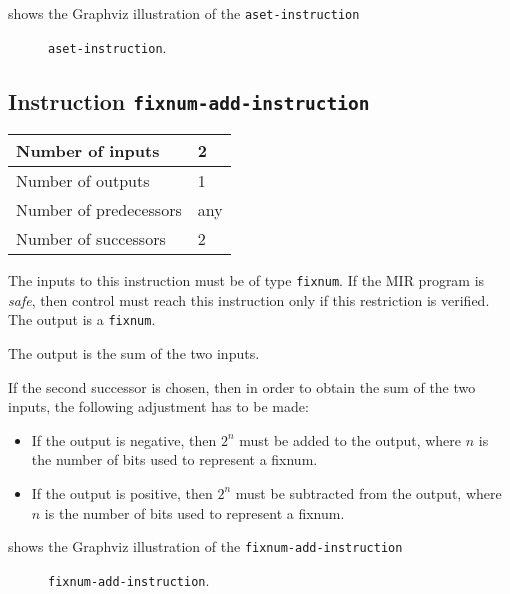  shows the Graphviz illustration of the
\texttt{aset-instruction}

\begin{figure}
\begin{center}
\end{center}
\caption{\label{fig-aset-instruction}
\texttt{aset-instruction}.}
\end{figure}

\subsection{Instruction \texttt{fixnum-add-instruction}}
\label{mir-instruction-fixnum-add}

\begin{tabular}{|l|l|}
\hline
Number of inputs & 2\\
\hline
Number of outputs & 1\\
\hline
Number of predecessors & any\\
\hline
Number of successors & 2\\
\hline
\end{tabular}

The inputs to this instruction must be of type \texttt{fixnum}.  If the
MIR program is \emph{safe}, then control must reach this instruction
only if this restriction is verified.  The output is a
\texttt{fixnum}.  

The output is the sum of the two inputs.

If the second successor is chosen, then in order to obtain the sum of the
two inputs, the following adjustment has to be made:

\begin{itemize}
\item If the output is negative, then $2^n$ must be added to the
  output, where $n$ is the number of bits used to represent a fixnum. 
\item If the output is positive, then $2^n$ must be subtracted from
  the output, where $n$ is the number of bits used to represent a
  fixnum.
\end{itemize}

 shows the Graphviz illustration of the
\texttt{fixnum-add-instruction}

\begin{figure}
\begin{center}
\end{center}
\caption{\label{fig-fixnum-add-instruction}
\texttt{fixnum-add-instruction}.}
\end{figure}

